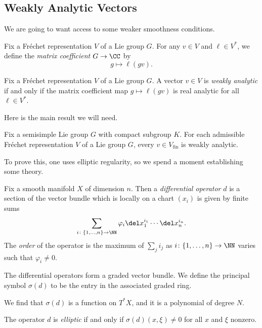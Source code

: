 \documentclass[../notes.tex]{subfiles}
\begin{document}
\subsection{Weakly Analytic Vectors}
We are going to want access to some weaker smoothness conditions.
\begin{definition}
	Fix a Fr\'echet representation $V$ of a Lie group $G$. For any $v\in V$ and $\ell\in V^*$, we define the \textit{matrix coefficient} $G\to\CC$ by
	\[g\mapsto\ell(gv).\]
\end{definition}
\begin{definition}
	Fix a Fr\'echet representation $V$ of a Lie group $G$. A vector $v\in V$ is \textit{weakly analytic} if and only if the matrix coefficient map $g\mapsto\ell(gv)$ is real analytic for all $\ell\in V^*$.
\end{definition}
Here is the main result we will need.
\begin{theorem}
	Fix a semisimple Lie group $G$ with compact subgroup $K$. For each admissible Fr\'echet representation $V$ of a Lie group $G$, every $v\in V_{\mathrm{fin}}$ is weakly analytic.
\end{theorem}
To prove this, one uses elliptic regularity, so we spend a moment establishing some theory.
\begin{definition}
	Fix a smooth manifold $X$ of dimension $n$. Then a \textit{differential operator} $d$ is a section of the vector bundle which is locally on a chart $(x_i)$ is given by finite sums
	\[\sum_{i\colon\{1,\ldots,n\}\to\NN}\varphi_i\del x_1^{i_1}\cdots\del x_n^{i_n}.\]
	The \textit{order} of the operator is the maximum of $\sum_ji_j$ as $i\colon\{1,\ldots,n\}\to\NN$ varies such that $\varphi_i\ne0$.
\end{definition}
\begin{remark}
	The differential operators form a graded vector bundle. We define the principal symbol $\sigma(d)$ to be the entry in the associated graded ring.
\end{remark}
\begin{remark}
	We find that $\sigma(d)$ is a function on $T^*X$, and it is a polynomial of degree $N$.
\end{remark}
\begin{definition}[elliptic]
	The operator $d$ is \textit{elliptic} if and only if $\sigma(d)(x,\xi)\ne0$ for all $x$ and $\xi$ nonzero.
\end{definition}
\end{document}
